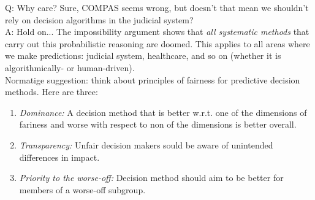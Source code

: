 Q: Why care? Sure, COMPAS seems wrong, but doesn't that mean we shouldn't rely on decision algorithms in the judicial system? \\

A: Hold on... The impossibility argument shows that {\it all systematic methods} that carry out this probabilistic reasoning are doomed. This applies to all areas where we make predictions: judicial system, healthcare, and so on (whether it is algorithmically- or human-driven). \\

Normatige suggestion: think about principles of fairness for predictive decision methods. Here are three:
\begin{enumerate}
	\item {\it Dominance:} A decision method that is better w.r.t. one of the dimensions of fariness and worse with respect to non of the dimensions is better overall.
	\item {\it Transparency:} Unfair decision makers sould be aware of unintended differences in impact.
	\item {\it Priority to the worse-off:} Decision method should aim to be better for members of a worse-off subgroup.
\end{enumerate}


\spacerule







